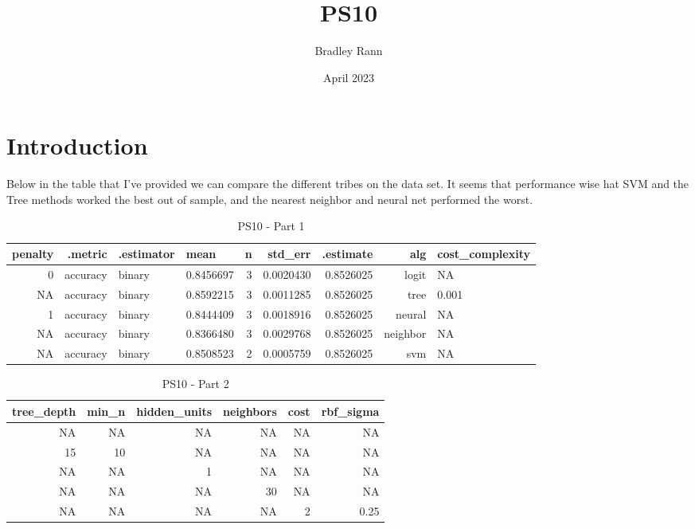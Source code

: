 \documentclass{article}
\title{PS10}
\author{Bradley Rann }
\date{April 2023}
\begin{document}
\maketitle

\section{Introduction}

Below in the table that I've provided we can compare the different tribes on the data set. It seems that performance wise hat SVM and the Tree methods worked the best out of sample, and the nearest neighbor and neural net performed the worst. 

\begin{table}
\centering
\begin{tabular}{rrllrrrrl}
\toprule
penalty & .metric & .estimator & mean & n & std\_err & .estimate & alg & cost\_complexity \\
\midrule
0 & accuracy & binary & 0.8456697 & 3 & 0.0020430 & 0.8526025 & logit & NA \\
NA & accuracy & binary & 0.8592215 & 3 & 0.0011285 & 0.8526025 & tree & 0.001 \\
1 & accuracy & binary & 0.8444409 & 3 & 0.0018916 & 0.8526025 & neural & NA \\
NA & accuracy & binary & 0.8366480 & 3 & 0.0029768 & 0.8526025 & neighbor & NA \\
NA & accuracy & binary & 0.8508523 & 2 & 0.0005759 & 0.8526025 & svm & NA \\
\bottomrule
\end{tabular}
\caption{PS10 - Part 1}
\end{table}

\begin{table}
\centering
\begin{tabular}{rrrrrr}
\toprule
tree\_depth & min\_n & hidden\_units & neighbors & cost & rbf\_sigma \\
\midrule
NA & NA & NA & NA & NA & NA \\
15 & 10 & NA & NA & NA & NA \\
NA & NA & 1 & NA & NA & NA \\
NA & NA & NA & 30 & NA & NA \\
NA & NA & NA & NA & 2 & 0.25 \\
\bottomrule
\end{tabular}
\caption{PS10 - Part 2}
\end{table}
\end{document}
